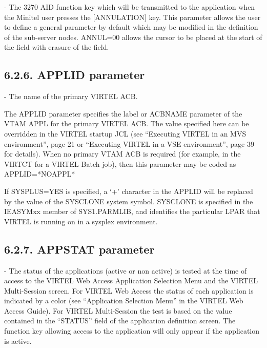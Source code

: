 \documentclass[letterpaper,10pt,english]{sphinxmanual}
\begin{document}
 - The 3270 AID function key which will be transmitted to the application when the Minitel user presses the {[}ANNULATION{]} key. This parameter allows the user to define a general parameter by default which may be modified in the definition of the sub-server nodes.
ANNUL=00 allows the cursor to be placed at the start of the field with erasure of the field.


\subsection{6.2.6. APPLID parameter}
\label{\detokenize{Installation_Guide:applid-parameter}}
\begin{sphinxVerbatim}[commandchars=\\\{\}]
 
\end{sphinxVerbatim}

 - The name of the primary VIRTEL ACB.

The APPLID parameter specifies the label or ACBNAME parameter of the VTAM APPL for the primary VIRTEL ACB. The value specified here can be overridden in the VIRTEL startup JCL (see “Executing VIRTEL in an MVS environment”, page 21 or “Executing VIRTEL in a VSE environment”, page 39 for details). When no primary VTAM ACB is required (for example, in the VIRTCT for a VIRTEL Batch job), then this parameter may be coded as APPLID=*NOAPPL*

If SYSPLUS=YES is specified, a ‘+’ character in the APPLID will be replaced by the value of the SYSCLONE system symbol. SYSCLONE is specified in the IEASYMxx member of SYS1.PARMLIB, and identifies the particular LPAR that VIRTEL is running on in a sysplex environment.


\subsection{6.2.7. APPSTAT parameter}
\label{\detokenize{Installation_Guide:appstat-parameter}}
\begin{sphinxVerbatim}[commandchars=\\\{\}]
 
\end{sphinxVerbatim}

 - The status of the applications (active or non active) is tested at the time of access to the VIRTEL Web Access Application Selection Menu and the VIRTEL Multi-Session screen. For VIRTEL Web Access the status of each application is indicated by a color (see “Application Selection Menu” in the VIRTEL Web Access Guide). For VIRTEL Multi-Session the test is based on the value contained in the “STATUS” field of the application definition screen. The function key allowing access to the application will only appear if the application is active.
\end{document}
